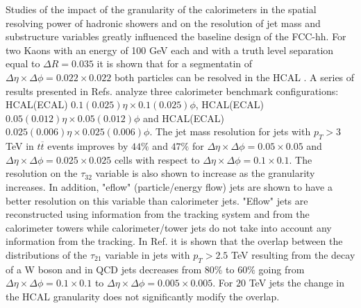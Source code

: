 Studies of the impact of the granularity of the calorimeters in the spatial resolving power of hadronic showers and on the resolution of jet mass and substructure variables greatly influenced the baseline design of the FCC-hh. For two Kaons with an energy of 100 GeV each and with a truth level separation equal to $\Delta R=0.035$ it is shown that for a segmentatin of $\Delta\eta\times\Delta\phi=0.022\times0.022$ both particles can be resolved in the HCAL \cite{FCC_HCALgran_doubleK}. A series of results presented in Refs. \cite{BOOST2017,FCCweek2015,FCCweek2016} analyze three calorimeter benchmark configurations: HCAL(ECAL) $0.1(0.025) \eta\times0.1(0.025)\phi$, HCAL(ECAL) $0.05(0.012) \eta\times0.05(0.012)\phi$ and HCAL(ECAL) $0.025(0.006) \eta \times 0.025(0.006)\phi$. The jet mass resolution for jets with $p_T>3$ TeV in $t\overline{t}$ events improves by $44 \%$ and $47 \%$ for $\Delta\eta\times\Delta\phi = 0.05 \times 0.05$ and $\Delta\eta\times\Delta\phi = 0.025 \times 0.025$ cells with respect to $\Delta\eta\times\Delta\phi = 0.1\times0.1$. The resolution on the $\tau_{32}$ variable is also shown to increase as the granularity increases. In addition, "eflow" (particle/energy flow) jets are shown to have a better resolution on this variable than calorimeter jets. "Eflow" jets are reconstructed using information from the tracking system and from the calorimeter towers while calorimeter/tower jets do not take into account any information from the tracking. In Ref. \cite{BOOST2017} it is shown that the overlap between the distributions of the $\tau_{21}$ variable in jets with $p_T>2.5$ TeV resulting from the decay of a W boson and in QCD jets decreases from $80\%$ to $60\%$ going from $\Delta\eta\times\Delta\phi = 0.1 \times 0.1$ to $\Delta\eta\times\Delta\phi = 0.005 \times 0.005$. For $20$ TeV jets the change in the HCAL granularity does not significantly modify the overlap.



